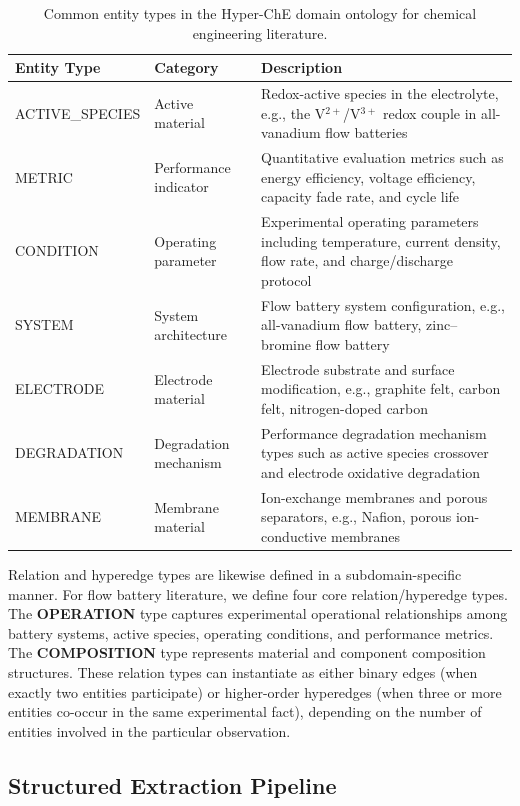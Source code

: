 \documentclass[11pt,a4paper]{article}
\begin{document}
\begin{table}[htbp]
\centering
\caption{Common entity types in the Hyper-ChE domain ontology for chemical engineering literature.}
\label{tab:entity-types}
\begin{tabular}{@{}p{2.8cm}p{2.2cm}p{7.8cm}@{}}
\toprule
\textbf{Entity Type} & \textbf{Category} & \textbf{Description} \\
\midrule
ACTIVE\_SPECIES & Active material & Redox-active species in the electrolyte, e.g., the V$^{2+}$/V$^{3+}$ redox couple in all-vanadium flow batteries \\
METRIC & Performance indicator & Quantitative evaluation metrics such as energy efficiency, voltage efficiency, capacity fade rate, and cycle life \\
CONDITION & Operating parameter & Experimental operating parameters including temperature, current density, flow rate, and charge/discharge protocol \\
SYSTEM & System architecture & Flow battery system configuration, e.g., all-vanadium flow battery, zinc--bromine flow battery \\
ELECTRODE & Electrode material & Electrode substrate and surface modification, e.g., graphite felt, carbon felt, nitrogen-doped carbon \\
DEGRADATION & Degradation mechanism & Performance degradation mechanism types such as active species crossover and electrode oxidative degradation \\
MEMBRANE & Membrane material & Ion-exchange membranes and porous separators, e.g., Nafion, porous ion-conductive membranes \\
\bottomrule
\end{tabular}
\end{table}

Relation and hyperedge types are likewise defined in a subdomain-specific manner. For flow battery literature, we define four core relation/hyperedge types. The \textbf{OPERATION} type captures experimental operational relationships among battery systems, active species, operating conditions, and performance metrics. The \textbf{COMPOSITION} type represents material and component composition structures. These relation types can instantiate as either binary edges (when exactly two entities participate) or higher-order hyperedges (when three or more entities co-occur in the same experimental fact), depending on the number of entities involved in the particular observation.

\subsection{Structured Extraction Pipeline}
\label{subsec:extraction}
\end{document}
